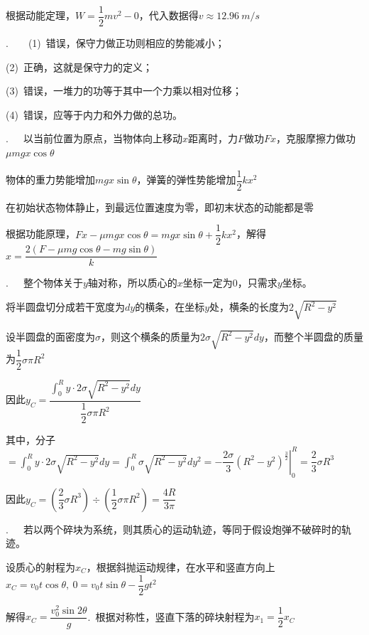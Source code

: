 根据动能定理，$W=\dfrac{1}{2}mv^2-0$，代入数据得$v\approx\SI{12.96}{m/s}$


.~~~~(1)~错误，保守力做正功则相应的势能减小；

(2)~正确，这就是保守力的定义；

(3)~错误，一堆力的功等于其中一个力乘以相对位移；

(4)~错误，应等于内力和外力做的总功。

\noindent\hdashrule{\textwidth}{1pt}{1pt}

.~~~以当前位置为原点，当物体向上移动$x$距离时，力$F$做功$Fx$，克服摩擦力做功$\mu mgx\cos{\theta}$

物体的重力势能增加$mgx\sin{\theta}$，弹簧的弹性势能增加$\dfrac{1}{2}kx^2$

在初始状态物体静止，到最远位置速度为零，即初末状态的动能都是零

根据功能原理，$Fx-\mu mgx\cos{\theta}=mgx\sin{\theta}+\dfrac{1}{2}kx^2$，解得$x=\dfrac{2(F-\mu mg\cos\theta-mg\sin\theta)}{k}$

\noindent\hdashrule{\textwidth}{1pt}{1pt}

.~~~整个物体关于$y$轴对称，所以质心的$x$坐标一定为$0$，只需求$y$坐标。

将半圆盘切分成若干宽度为$dy$的横条，在坐标$y$处，横条的长度为$2\sqrt{R^2-y^2}$

设半圆盘的面密度为$\sigma$，则这个横条的质量为$2\sigma\sqrt{R^2-y^2}dy$，而整个半圆盘的质量为$\dfrac{1}{2}\sigma \pi R^2$

因此$y_C=\dfrac{\displaystyle\int_0^R{y\cdot 2\sigma\sqrt{R^2-y^2}dy}}{\dfrac{1}{2}\sigma \pi R^2}$

其中，分子$=\displaystyle\int_0^R{y\cdot 2\sigma\sqrt{R^2-y^2}dy}=\int_0^R{\sigma\sqrt{R^2-y^2}dy^2}=\left.-\dfrac{2\sigma}{3}(R^2-y^2)^{\frac{3}{2}}\right|_0^R=\dfrac{2}{3}\sigma R^3$

因此$y_C=\left(\dfrac{2}{3}\sigma R^3\right)\div \left(\dfrac{1}{2}\sigma \pi R^2\right)=\dfrac{4R}{3\pi}$

\noindent\hdashrule{\textwidth}{1pt}{1pt}

.~~~若以两个碎块为系统，则其质心的运动轨迹，等同于假设炮弹不破碎时的轨迹。

设质心的射程为$x_C$，根据斜抛运动规律，在水平和竖直方向上$x_C=v_0t\cos\theta,~0=v_0t\sin\theta-\dfrac{1}{2}gt^2$

解得$x_C=\dfrac{v_0^2\sin{2\theta}}{g}$.~根据对称性，竖直下落的碎块射程为$x_1=\dfrac{1}{2}x_C$


